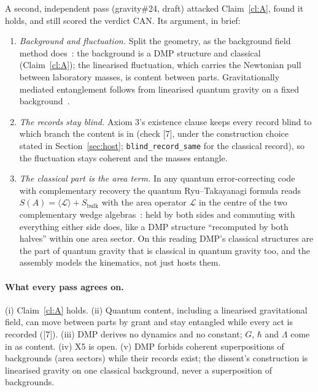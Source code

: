 \documentclass[11pt,a4paper]{article}
\theoremstyle{definition}
\theoremstyle{remark}
\newcommand{\lean}[1]{\texttt{#1}}
\newcommand{\chk}[1]{\textsf{[#1]}}
\begin{document}
A second, independent pass (gravity\#24, draft) attacked Claim~\ref{cl:A}, found it holds, and still scored the verdict CAN. Its
argument, in brief:
\begin{enumerate}[nosep]
\item \emph{Background and fluctuation.} Split the geometry, as the background field method does~\cite{dewitt}: the background is a DMP
structure and classical (Claim~\ref{cl:A}); the linearised fluctuation, which carries the Newtonian pull between laboratory masses, is
content between parts. Gravitationally mediated entanglement follows from linearised quantum gravity on a fixed
background~\cite{christodoulou}.
\item \emph{The records stay blind.} Axiom 3's existence clause keeps every record blind to which branch the content is in
(check \chk{7}, under the construction choice stated in Section~\ref{sec:host}; \lean{blind\_record\_same} for the classical record),
so the fluctuation stays coherent and the masses entangle.
\item \emph{The classical part is the area term.} In any quantum error-correcting code with complementary recovery the quantum Ryu--Takayanagi formula reads
$S(A)=\langle \mathcal{L}\rangle + S_{\text{bulk}}$ with the area operator $\mathcal{L}$ in the centre of the two complementary wedge
algebras~\cite{harlow}: held by both sides and commuting with everything either side does, like a DMP structure ``recomputed by both
halves'' within one area sector. On this reading DMP's classical structures are the part of quantum gravity that is classical in quantum gravity too, and
the assembly models the kinematics, not just hosts them.
\end{enumerate}

\paragraph{What every pass agrees on.} (i) Claim~\ref{cl:A} holds. (ii) Quantum content, including a linearised gravitational field, can
move between parts by grant and stay entangled while every act is recorded (\chk{7}). (iii) DMP derives no dynamics and no constant; $G$,
$\hbar$ and $\Lambda$ come in as content. (iv) X5 is open. (v) DMP forbids coherent superpositions of backgrounds (area sectors) while their
records exist; the dissent's construction is linearised gravity on one classical background, never a superposition of backgrounds.
\end{document}
